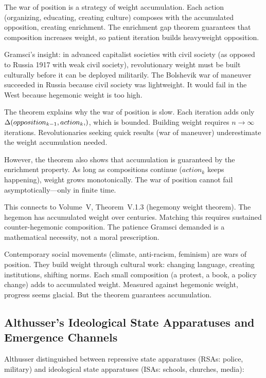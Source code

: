 \begin{interpretation}
The war of position is a strategy of weight accumulation. Each action (organizing,
educating, creating culture) composes with the accumulated opposition, creating
enrichment. The enrichment gap theorem guarantees that composition increases
weight, so patient iteration builds heavyweight opposition.

Gramsci's insight: in advanced capitalist societies with civil society (as
opposed to Russia 1917 with weak civil society), revolutionary weight must be
built culturally before it can be deployed militarily. The Bolshevik war of
maneuver succeeded in Russia because civil society was lightweight. It would
fail in the West because hegemonic weight is too high.

The theorem explains why the war of position is slow. Each iteration adds only
$\enrich{opposition_{k-1}, action_k}$, which is bounded. Building weight requires
$n \to \infty$ iterations. Revolutionaries seeking quick results (war of maneuver)
underestimate the weight accumulation needed.

However, the theorem also shows that accumulation is guaranteed by the enrichment
property. As long as compositions continue ($action_k$ keeps happening), weight
grows monotonically. The war of position cannot fail asymptotically---only in
finite time.

This connects to Volume~V, Theorem~V.1.3 (hegemony weight theorem). The hegemon
has accumulated weight over centuries. Matching this requires sustained
counter-hegemonic composition. The patience Gramsci demanded is a mathematical
necessity, not a moral prescription.

Contemporary social movements (climate, anti-racism, feminism) are wars of
position. They build weight through cultural work: changing language, creating
institutions, shifting norms. Each small composition (a protest, a book, a
policy change) adds to accumulated weight. Measured against hegemonic weight,
progress seems glacial. But the theorem guarantees accumulation.
\end{interpretation}

\subsection{Althusser's Ideological State Apparatuses and Emergence Channels}

Althusser distinguished between repressive state apparatuses (RSAs: police,
military) and ideological state apparatuses (ISAs: schools, churches, media):


